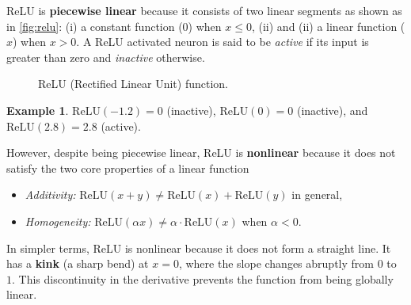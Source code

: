\documentclass[oneside,11pt,dvipsnames]{book}
\numberwithin{equation}{section}
\theoremstyle{definition}
\newtheorem{example}{Example}[section]
\theoremstyle{remark}
\newcommand{\relu}[1]{\mathrm{ReLU}\left(#1\right)}
\begin{document}
ReLU is \textbf{piecewise linear} because it consists of two linear segments as shown as in \autoref{fig:relu}: (i) a constant function ($0$) when $x \leq 0$, (ii) and (ii) a linear function ($x$) when $x > 0$.
A ReLU activated neuron is said to be \emph{active} if its input is greater than zero and \emph{inactive} otherwise.


\begin{figure}[h]
    \centering
    \caption{ReLU (Rectified Linear Unit) function.}\label{fig:relu}
\end{figure}

\begin{example}
$\relu{-1.2} = 0$ (inactive), $\relu{0} = 0$ (inactive), and $\relu{2.8} = 2.8$ (active).
\end{example}


However, despite being piecewise linear, ReLU is \textbf{nonlinear} because it does not satisfy the two core properties of a linear function

    \begin{itemize}
        \item \textit{Additivity:} $\text{ReLU}(x + y) \ne \text{ReLU}(x) + \text{ReLU}(y)$ in general,
        \item \textit{Homogeneity:} $\text{ReLU}(\alpha x) \ne \alpha \cdot \text{ReLU}(x)$ when $\alpha < 0$.
    \end{itemize}

In simpler terms, ReLU is nonlinear because it does not form a straight line.  It has a \textbf{kink} (a sharp bend) at $x = 0$, where the slope changes abruptly from $0$ to $1$. This discontinuity in the derivative prevents the function from being globally linear.
\end{document}
